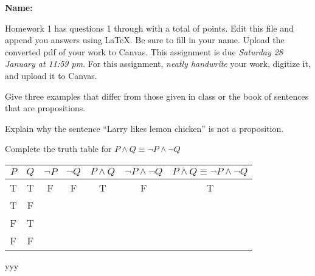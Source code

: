\documentclass[12pt,fleqn,answers]{exam}
\newcommand\PM{{\sc pm}}
\newcommand{\quiz}{1}
\newcommand{\term}{Fall}
\newcommand{\due}{Saturday 28 January at 11:59 \PM}
\begin{document}
\large
\vspace{0.1in}
\noindent{}
{\bf Name:}  \\
\noindent \makebox[3.0truein][l]{\bf Homework   \quiz, \term \/ \the\year}
\vspace{0.1in}

\begin{quote}
    \end{quote}
\noindent  Homework    \quiz\/  has questions 1 through  \numquestions \/ with a total of  \numpoints\/  points.   Edit this file and append you answers using La\TeX. Be sure to fill in your name. Upload the converted pdf of your work to Canvas.   This assignment is due \emph{\due}.
For this assignment, \emph{neatly handwrite} your work, digitize it,
and upload it to Canvas.


\vspace{0.1in}


\begin{questions} 

\question[5] Give three examples that differ from those given in class
or the book of sentences that are propositions.

\question[5] Explain why the sentence ``Larry likes lemon chicken''
is not a proposition.

\question [5] Complete the truth table for $P \land Q \equiv \lnot P \land \lnot Q$

\vspace{0.1in}
\begin{tabular}{|c|c|c|c|c|c|c|}
\hline 
\(P\) & \(Q\) & \(\lnot P \) & \(\lnot Q \) & \(P \land Q\) & \(\lnot P \land  \lnot Q\) & \(P \land Q \equiv \lnot P \land \lnot Q\) \\ \hline \hline
 T  & T & F & F & T & F & T   \\  \hline
 T  & F &   &   &   &   &     \\ \hline 
 F  & T &   &   &   &   &     \\ \hline 
 F  & F &   &   &   &   &     \\ \hline 
\end{tabular}



\begin{solution}  yyy
\end{solution}




\end{questions}
\end{document}
